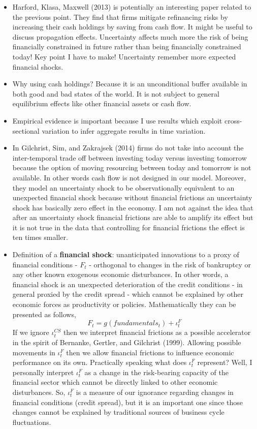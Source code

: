 \documentclass{article}
\begin{document}
{\begin{itemize}
	\item Harford, Klasa, Maxwell (2013) is potentially an interesting paper related to the previous point. They find that firms mitigate refinancing risks by increasing their cash holdings by saving from cash flow. It might be useful to discuss propagation effects. Uncertainty affects much more the risk of being financially constrained in future rather than being financially constrained today! Key point I have to make! Uncertainty remember more expected financial shocks.
	\item Why using cash holdings? Because it is an unconditional buffer available in both good and bad states of the world. It is not subject to general equilibrium effects like other financial assets or cash flow. 
	\item Empirical evidence is important because I use results which exploit cross-sectional variation to infer aggregate results in time variation.
	\item In Gilchrist, Sim, and Zakrajsek (2014) firms do not take into account the inter-temporal trade off between investing today versus investing tomorrow because the option of moving resourcing between today and tomorrow is not available. In other words cash flow is not designed in our model. Moreover, they model an uncertainty shock to be observationally equivalent to an unexpected financial shock because without financial frictions an uncertainty shock has basically zero effect in the economy. I am not against the idea that after an uncertainty shock financial frictions are able to amplify its effect but it is not true in the data that controlling for financial frictions the effect is ten times smaller. 
	\item Definition of a \textbf{financial shock}: unanticipated innovations to a proxy of financial conditions - $F_t$ - orthogonal to changes in the risk of bankruptcy or any other known exogenous economic disturbances. In other words, a financial shock is an unexpected deterioration of the credit conditions - in general proxied by the credit spread - which cannot be explained by other economic forces as productivity or policies. Mathematically they can be presented as follows,
	$$
	F_t = g(fundamentals_t) + \iota_t^{F}
	$$ 
	If we ignore $\iota_t^{CS}$ then we interpret financial frictions as a possible accelerator in the spirit of Bernanke, Gertler, and Gilchrist (1999). Allowing possible movements in $\iota_t^{F}$ then we allow financial frictions to influence economic performance on its own. Practically speaking what does $\iota_t^F$ represent? Well, I personally interpret $\iota_t^F$ as a change in the risk-bearing capacity of the financial sector which cannot be directly linked to other economic disturbances. So, $\iota_t^F$ is a measure of our ignorance regarding changes in financial conditions (credit spread), but it is an important one since those changes cannot be explained by traditional sources of business cycle fluctuations. 

\end{itemize}}
\end{document}
